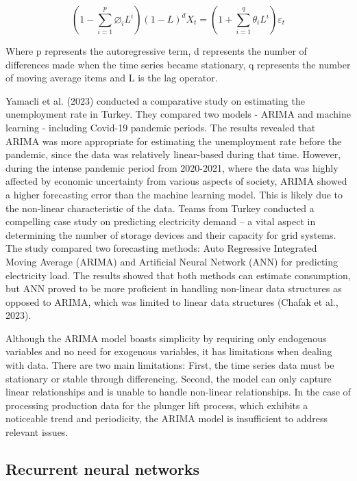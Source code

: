 \documentclass[sn-mathphys,Numbered]{sn-jnl}%
\theoremstyle{thmstyleone}%
\theoremstyle{thmstyletwo}%
\theoremstyle{thmstylethree}%
\begin{document}
\begin{equation}
{({1 - {\sum\limits_{i = 1}^{p}\varnothing_{i}}L^{i}})}\left({1 - L} \right)^{d}X_{t} = \left({1 + {\sum\limits_{i = 1}^{q}{\theta_{i}L^{i}}}} \right)\varepsilon_{t}
\end{equation}

Where p represents the autoregressive term, d represents the number of differences made when the time series became stationary, q represents the number of moving average items and L is the lag operator.

Yamacli et al. (2023) conducted a comparative study on estimating the unemployment rate in Turkey. They compared two models - ARIMA and machine learning - including Covid-19 pandemic periods. The results revealed that ARIMA was more appropriate for estimating the unemployment rate before the pandemic, since the data was relatively linear-based during that time. However, during the intense pandemic period from 2020-2021, where the data was highly affected by economic uncertainty from various aspects of society, ARIMA showed a higher forecasting error than the machine learning model. This is likely due to the non-linear characteristic of the data. Teams from Turkey conducted a compelling case study on predicting electricity demand – a vital aspect in determining the number of storage devices and their capacity for grid systems. The study compared two forecasting methods: Auto Regressive Integrated Moving Average (ARIMA) and Artificial Neural Network (ANN) for predicting electricity load. The results showed that both methods can estimate consumption, but ANN proved to be more proficient in handling non-linear data structures as opposed to ARIMA, which was limited to linear data structures (Chafak et al., 2023).

Although the ARIMA model boasts simplicity by requiring only endogenous variables and no need for exogenous variables, it has limitations when dealing with data. There are two main limitations: First, the time series data must be stationary or stable through differencing. Second, the model can only capture linear relationships and is unable to handle non-linear relationships. In the case of processing production data for the plunger lift process, which exhibits a noticeable trend and periodicity, the ARIMA model is insufficient to address relevant issues.

\subsection{Recurrent neural networks}\label{subsec4}
\end{document}

